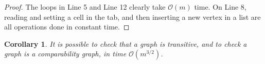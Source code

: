 \documentclass[11pt,a4paper]{article}
\newcommand{\BigO}{\mathcal O}
\newtheorem{Corol}{Corollary}
\theoremstyle{definition}
\begin{document}
\begin{proof}
The loops in Line 5 and Line 12 clearly take $\BigO(m)$ time.
On Line 8, reading and setting a cell in the tab, and then inserting
a new vertex in a list are all operations done in constant time.
\end{proof}






\begin{Corol}
It is possible to check that a graph is transitive, and to check
a graph is a comparability graph, in time $\BigO(m^{3/2})$.
\end{Corol}

\end{document}
